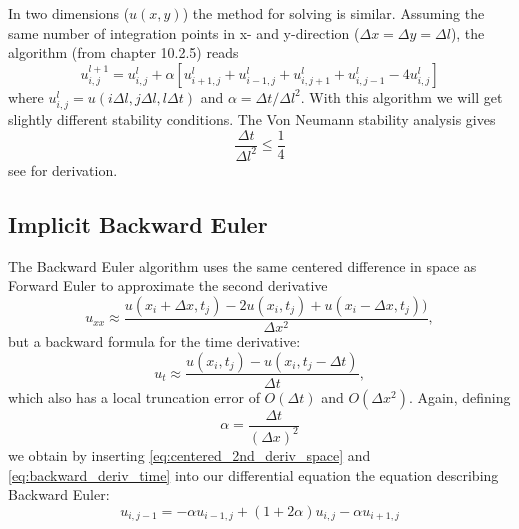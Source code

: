\documentclass[reprint, english,notitlepage,nofootinbib]{revtex4-1}  %
\begin{document}
In two dimensions ($u(x,y)$) the method for solving is similar. Assuming the same number of integration points in x- and y-direction ($\Delta x = \Delta y = \Delta l$), the algorithm (from \cite{lectures2015} chapter 10.2.5) reads
\begin{equation}
	\label{eq:3dEuler}
	u_{i,j}^{l+1} = u_{i,j}^{l} + \alpha \left[u_{i+1,j}^{l} + u_{i-1,j}^{l} + u_{i,j+1}^{l} + u_{i,j-1}^{l} - 4u_{i,j}^{l}\right]
\end{equation}
where $u_{i,j}^l = u(i\Delta l, j \Delta l, l\Delta t)$ and $\alpha = \Delta t/\Delta l^2$. With this algorithm we will get slightly different stability conditions. The Von Neumann stability analysis gives
\begin{equation}
	\label{eq:2D_von_neumann_stability}
	\frac{\Delta t}{\Delta l^2} \leq \frac{1}{4}
\end{equation}
see \cite{MiT} for derivation.


\subsection*{Implicit Backward Euler}

The Backward Euler algorithm uses the same centered difference in space as Forward Euler to approximate the second derivative
\begin{equation}
  \label{eq:centered_2nd_deriv_space}
	u_{xx} \approx \frac{u(x_i + \Delta x, t_j) - 2u(x_i,t_j) + u(x_i-\Delta x, t_j))}{\Delta x^2},
\end{equation}
but a backward formula for the time derivative:
\begin{equation}
  \label{eq:backward_deriv_time}
  u_t \approx \frac{u(x_i, t_j) - u(x_i, t_j - \Delta t)}{\Delta t},
\end{equation}
which also has a local truncation error of $O(\Delta t)$ and $O(\Delta x ^2)$.
Again, defining
\begin{equation*}
  \alpha = \frac{\Delta t}{(\Delta x)^2}
\end{equation*}
we obtain by inserting \eqref{eq:centered_2nd_deriv_space} and \eqref{eq:backward_deriv_time} into our differential equation the equation describing Backward Euler:
\begin{equation}
  \label{eq:backward_euler}
  u_{i, j-1} = -\alpha u_{i-1, j} + (1 + 2 \alpha) u_{i, j} - \alpha u_{i+1, j}
\end{equation}
\end{document}
